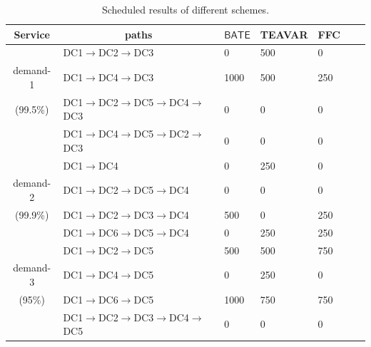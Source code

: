 \documentclass[sigconf]{acmart}
\begin{document}
 \begin{table}
\scriptsize
\centering
\caption{Scheduled results of different schemes.}\label{testbed-1}
\renewcommand{\arraystretch}{1.0}
\begin{tabular}{|c|l|l|l|l|ll} \hline
\setlength{\tabcolsep}{10pt}
{Service}&\multicolumn{1}{|c|}{paths}&\multicolumn{1}{|c|}{$\mathsf{BATE}$}&\multicolumn{1}{|c|}{TEAVAR}&\multicolumn{1}{|c|}{FFC}\\
\hline
&{DC1$\to$DC2$\to$DC3}&0&500&0\\
{demand-1}&{DC1$\to$DC4$\to$DC3}&1000&500&250\\
(99.5\%)&{DC1$\to$DC2$\to$DC5$\to$DC4$\to$DC3}&0&0&0\\
&{DC1$\to$DC4$\to$DC5$\to$DC2$\to$DC3}&0&0&0\\
\hline
&{DC1$\to$DC4}&0&250&0\\
{demand-2}&{DC1$\to$DC2$\to$DC5$\to$DC4}&0&0&0\\
(99.9\%)&{DC1$\to$DC2$\to$DC3$\to$DC4}&500&0&250\\
&{DC1$\to$DC6$\to$DC5$\to$DC4}&0&250&250\\
\hline
&{DC1$\to$DC2$\to$DC5}&500&500&750\\
{demand-3}&{DC1$\to$DC4$\to$DC5}&0&250&0\\
(95\%)&{DC1$\to$DC6$\to$DC5}&1000&750&750\\
&{DC1$\to$DC2$\to$DC3$\to$DC4$\to$DC5}&0&0&0\\
\hline
\end{tabular}
\end{table}
\end{document}
